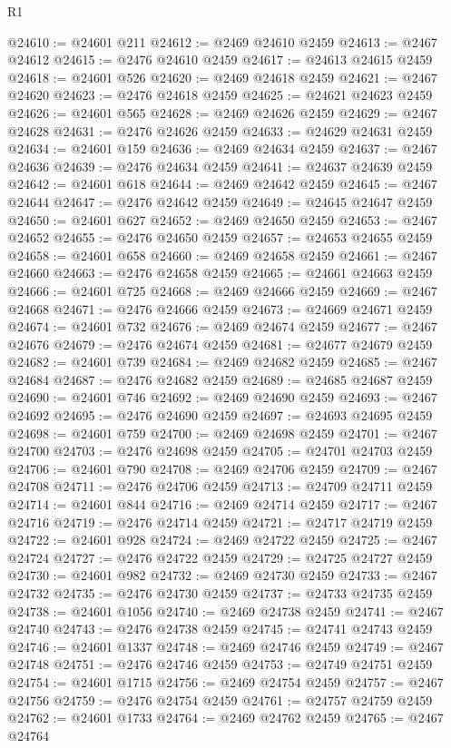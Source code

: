 \begin{lexlean}{R1}
\begin{coremodule}
@24610 := @24601 @211
@24612 := @2469 @24610 @2459
@24613 := @2467 @24612
@24615 := @2476 @24610 @2459
@24617 := @24613 @24615 @2459
@24618 := @24601 @526
@24620 := @2469 @24618 @2459
@24621 := @2467 @24620
@24623 := @2476 @24618 @2459
@24625 := @24621 @24623 @2459
@24626 := @24601 @565
@24628 := @2469 @24626 @2459
@24629 := @2467 @24628
@24631 := @2476 @24626 @2459
@24633 := @24629 @24631 @2459
@24634 := @24601 @159
@24636 := @2469 @24634 @2459
@24637 := @2467 @24636
@24639 := @2476 @24634 @2459
@24641 := @24637 @24639 @2459
@24642 := @24601 @618
@24644 := @2469 @24642 @2459
@24645 := @2467 @24644
@24647 := @2476 @24642 @2459
@24649 := @24645 @24647 @2459
@24650 := @24601 @627
@24652 := @2469 @24650 @2459
@24653 := @2467 @24652
@24655 := @2476 @24650 @2459
@24657 := @24653 @24655 @2459
@24658 := @24601 @658
@24660 := @2469 @24658 @2459
@24661 := @2467 @24660
@24663 := @2476 @24658 @2459
@24665 := @24661 @24663 @2459
@24666 := @24601 @725
@24668 := @2469 @24666 @2459
@24669 := @2467 @24668
@24671 := @2476 @24666 @2459
@24673 := @24669 @24671 @2459
@24674 := @24601 @732
@24676 := @2469 @24674 @2459
@24677 := @2467 @24676
@24679 := @2476 @24674 @2459
@24681 := @24677 @24679 @2459
@24682 := @24601 @739
@24684 := @2469 @24682 @2459
@24685 := @2467 @24684
@24687 := @2476 @24682 @2459
@24689 := @24685 @24687 @2459
@24690 := @24601 @746
@24692 := @2469 @24690 @2459
@24693 := @2467 @24692
@24695 := @2476 @24690 @2459
@24697 := @24693 @24695 @2459
@24698 := @24601 @759
@24700 := @2469 @24698 @2459
@24701 := @2467 @24700
@24703 := @2476 @24698 @2459
@24705 := @24701 @24703 @2459
@24706 := @24601 @790
@24708 := @2469 @24706 @2459
@24709 := @2467 @24708
@24711 := @2476 @24706 @2459
@24713 := @24709 @24711 @2459
@24714 := @24601 @844
@24716 := @2469 @24714 @2459
@24717 := @2467 @24716
@24719 := @2476 @24714 @2459
@24721 := @24717 @24719 @2459
@24722 := @24601 @928
@24724 := @2469 @24722 @2459
@24725 := @2467 @24724
@24727 := @2476 @24722 @2459
@24729 := @24725 @24727 @2459
@24730 := @24601 @982
@24732 := @2469 @24730 @2459
@24733 := @2467 @24732
@24735 := @2476 @24730 @2459
@24737 := @24733 @24735 @2459
@24738 := @24601 @1056
@24740 := @2469 @24738 @2459
@24741 := @2467 @24740
@24743 := @2476 @24738 @2459
@24745 := @24741 @24743 @2459
@24746 := @24601 @1337
@24748 := @2469 @24746 @2459
@24749 := @2467 @24748
@24751 := @2476 @24746 @2459
@24753 := @24749 @24751 @2459
@24754 := @24601 @1715
@24756 := @2469 @24754 @2459
@24757 := @2467 @24756
@24759 := @2476 @24754 @2459
@24761 := @24757 @24759 @2459
@24762 := @24601 @1733
@24764 := @2469 @24762 @2459
@24765 := @2467 @24764

\end{coremodule}
\end{lexlean}

